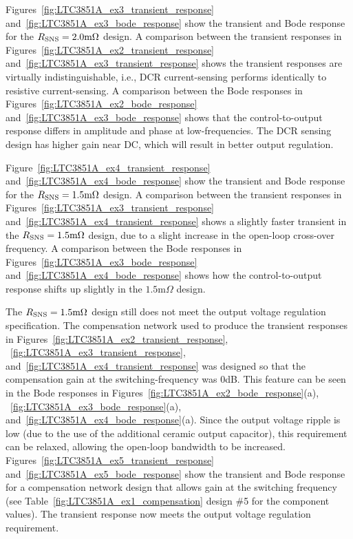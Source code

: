 Figures~\ref{fig:LTC3851A_ex3_transient_response} 
and~\ref{fig:LTC3851A_ex3_bode_response} show the transient and Bode
response for the $R_{\rm SNS} = 2.0\text{m}\Omega$ design.
A comparison between the transient responses in
Figures~\ref{fig:LTC3851A_ex2_transient_response} 
and~\ref{fig:LTC3851A_ex3_transient_response} 
shows the transient responses are virtually indistinguishable,
i.e., DCR current-sensing performs identically to resistive
current-sensing.
A comparison between the Bode responses in
Figures~\ref{fig:LTC3851A_ex2_bode_response} 
and~\ref{fig:LTC3851A_ex3_bode_response} shows that the
control-to-output response differs in amplitude and phase 
at low-frequencies. The DCR sensing design has higher gain near 
DC, which will result in better output regulation.

Figure~\ref{fig:LTC3851A_ex4_transient_response} 
and~\ref{fig:LTC3851A_ex4_bode_response} show the transient and Bode
response for the $R_{\rm SNS} = 1.5\text{m}\Omega$ design.
A comparison between the transient responses in
Figures~\ref{fig:LTC3851A_ex3_transient_response} 
and~\ref{fig:LTC3851A_ex4_transient_response} shows a slightly
faster transient in the $R_{\rm SNS} = 1.5\text{m}\Omega$ design,
due to a slight increase in the open-loop cross-over frequency.
A comparison between the Bode responses in
Figures~\ref{fig:LTC3851A_ex3_bode_response} 
and~\ref{fig:LTC3851A_ex4_bode_response} shows how the
control-to-output response shifts up slightly in the
$1.5\text{m}\Omega$ design.

The $R_{\rm SNS} = 1.5\text{m}\Omega$ design still does not meet
the output voltage regulation specification.
The compensation network used to produce the transient responses in
Figures~\ref{fig:LTC3851A_ex2_transient_response},
~\ref{fig:LTC3851A_ex3_transient_response},
and~\ref{fig:LTC3851A_ex4_transient_response}
was designed so that the compensation gain at the switching-frequency
was 0dB. This feature can be seen in the Bode responses in
Figures~\ref{fig:LTC3851A_ex2_bode_response}(a),
~\ref{fig:LTC3851A_ex3_bode_response}(a),
and~\ref{fig:LTC3851A_ex4_bode_response}(a).
Since the output voltage ripple is low (due to the use of the
additional ceramic output capacitor), this requirement can be
relaxed, allowing the open-loop bandwidth to be increased.
Figures~\ref{fig:LTC3851A_ex5_transient_response}
and~\ref{fig:LTC3851A_ex5_bode_response} show the transient
and Bode response for a compensation network design that
allows gain at the switching frequency (see 
Table~\ref{fig:LTC3851A_ex1_compensation} design \#5 for the
component values). The transient response
now meets the output voltage regulation requirement.

